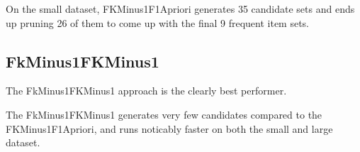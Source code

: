 \documentclass[11pt,a4paper]{article}
\begin{document}
On the small dataset, FKMinus1F1Apriori generates 35 candidate sets and ends up pruning 26 of them to come up with the final 9 frequent item sets.

\subsection{FkMinus1FKMinus1}

The FkMinus1FKMinus1 approach is the clearly best performer.

The FkMinus1FKMinus1 generates very few candidates compared to the FKMinus1F1Apriori, and runs noticably faster on both the small and large dataset.

\end{document}
